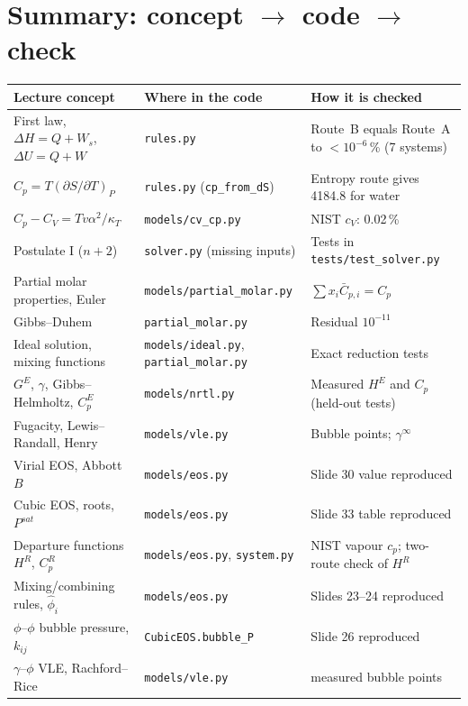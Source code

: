 \documentclass[11pt,a4paper]{article}
\newcommand{\code}[1]{\texttt{\small #1}}
\begin{document}
\section{Summary: concept $\to$ code $\to$ check}
\begin{longtable}{>{\raggedright}p{4.6cm} >{\raggedright}p{5.0cm} >{\raggedright\arraybackslash}p{5.6cm}}
\toprule
Lecture concept & Where in the code & How it is checked\\
\midrule\endhead
First law, $\Delta H=Q+W_s$, $\Delta U=Q+W$ & \code{rules.py} & Route~B equals Route~A to $<10^{-6}$\,\% (7 systems)\\
$C_p=T(\partial S/\partial T)_P$ & \code{rules.py} (\code{cp\_from\_dS}) & Entropy route gives 4184.8 for water\\
$C_p-C_V=Tv\alpha^2/\kappa_T$ & \code{models/cv\_cp.py} & NIST $c_V$: 0.02\,\%\\
Postulate I ($n+2$) & \code{solver.py} (missing inputs) & Tests in \code{tests/test\_solver.py}\\
Partial molar properties, Euler & \code{models/partial\_molar.py} & $\sum x_i\bar C_{p,i}=C_p$\\
Gibbs--Duhem & \code{partial\_molar.py} & Residual $10^{-11}$\\
Ideal solution, mixing functions & \code{models/ideal.py}, \code{partial\_molar.py} & Exact reduction tests\\
$G^E$, $\gamma$, Gibbs--Helmholtz, $C_p^E$ & \code{models/nrtl.py} & Measured $H^E$ and $C_p$ (held-out tests)\\
Fugacity, Lewis--Randall, Henry & \code{models/vle.py} & Bubble points; $\gamma^\infty$\\
Virial EOS, Abbott $B$ & \code{models/eos.py} & Slide 30 value reproduced\\
Cubic EOS, roots, $P^{sat}$ & \code{models/eos.py} & Slide 33 table reproduced\\
Departure functions $H^R$, $C_p^R$ & \code{models/eos.py}, \code{system.py} & NIST vapour $c_p$; two-route check of $H^R$\\
Mixing/combining rules, $\hat\phi_i$ & \code{models/eos.py} & Slides 23--24 reproduced\\
$\phi$--$\phi$ bubble pressure, $k_{ij}$ & \code{CubicEOS.bubble\_P} & Slide 26 reproduced\\
$\gamma$--$\phi$ VLE, Rachford--Rice & \code{models/vle.py} & 409 measured bubble points\\
\bottomrule
\end{longtable}
\end{document}
